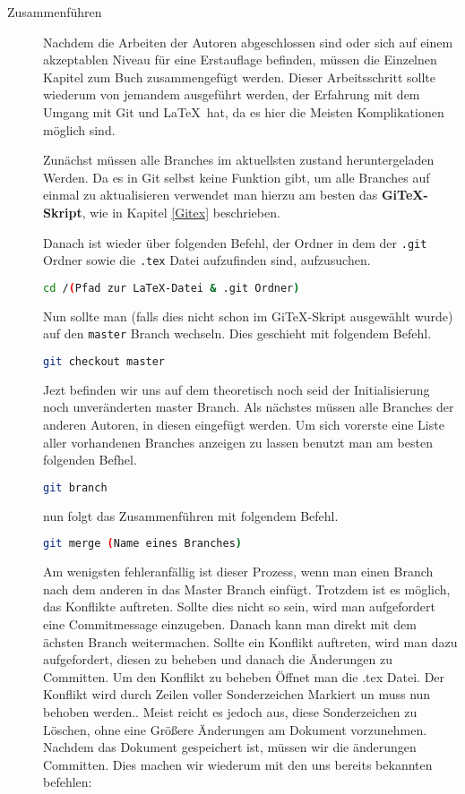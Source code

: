 \documentclass[12pt,a4paper]{scrartcl}
\begin{document}
\begin{description}
\item[Zusammenführen]
Nachdem die Arbeiten der Autoren abgeschlossen sind oder sich auf einem akzeptablen Niveau für eine Erstauflage befinden, müssen die Einzelnen Kapitel zum Buch zusammengefügt werden. Dieser Arbeitsschritt sollte wiederum von jemandem ausgeführt werden, der Erfahrung mit dem Umgang mit Git und \LaTeX \ hat, da es hier die Meisten Komplikationen möglich sind. 

Zunächst müssen alle Branches im aktuellsten zustand heruntergeladen Werden. Da es in Git selbst keine Funktion gibt, um alle Branches auf einmal zu aktualisieren verwendet man hierzu am besten das \textbf{GiTeX-Skript}, wie in Kapitel \ref{Gitex} beschrieben. 

Danach ist wieder über folgenden Befehl, der Ordner in dem der \verb+.git+ Ordner sowie die \verb+.tex+ Datei aufzufinden sind, aufzusuchen.

\begin{lstlisting}[language=bash]
cd /(Pfad zur LaTeX-Datei & .git Ordner)
\end{lstlisting}

Nun sollte man (falls dies nicht schon im GiTeX-Skript ausgewählt wurde) auf den \verb+master+ Branch wechseln. Dies geschieht mit folgendem Befehl.
 
\begin{lstlisting}[language=bash]
git checkout master
\end{lstlisting} 

Jezt befinden wir uns auf dem theoretisch noch seid der Initialisierung noch unveränderten master Branch. Als nächstes müssen alle Branches der anderen Autoren, in diesen eingefügt werden. Um sich vorerste eine Liste aller vorhandenen Branches anzeigen zu lassen benutzt man am besten folgenden Befhel. 

\begin{lstlisting}[language=bash]
git branch
\end{lstlisting} 

nun folgt das Zusammenführen mit folgendem Befehl.

\begin{lstlisting}[language=bash]
git merge (Name eines Branches)
\end{lstlisting} 

Am wenigsten fehleranfällig ist dieser Prozess, wenn man einen Branch nach dem anderen in das Master Branch einfügt. Trotzdem ist es möglich, das Konflikte auftreten. Sollte dies nicht so sein, wird man aufgefordert eine Commitmessage einzugeben. Danach kann man direkt mit dem ächsten Branch weitermachen. Sollte ein Konflikt auftreten, wird man dazu aufgefordert, diesen zu beheben und danach die Änderungen zu Committen. Um den Konflikt zu beheben Öffnet man die .tex Datei. Der Konflikt wird durch Zeilen voller Sonderzeichen Markiert un muss nun behoben werden.. Meist reicht es jedoch aus, diese Sonderzeichen zu Löschen, ohne eine Größere Änderungen am Dokument vorzunehmen. Nachdem das Dokument gespeichert ist, müssen wir die änderungen Committen. Dies machen wir wiederum mit den uns bereits bekannten befehlen:


\end{description}
\end{document}
